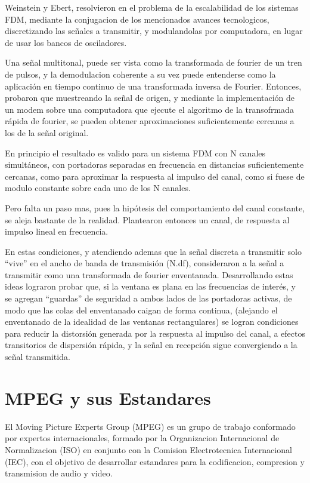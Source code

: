 Weinstein y Ebert, resolvieron en \cite{discrete-ofdm} el problema de la escalabilidad de los sistemas FDM, mediante la conjugacion de los mencionados avances tecnologicos, discretizando las señales a transmitir, y modulandolas por computadora, en lugar de usar los bancos de osciladores. 

Una señal multitonal, puede ser vista como la transformada de fourier de un tren de pulsos, y la demodulacion coherente a su vez puede entenderse como la aplicación en tiempo continuo de una transformada inversa de Fourier. Entonces, probaron que muestreando la señal de origen, y mediante la implementación de un modem sobre una computadora que ejecute el algoritmo de la transofrmada rápida de fourier, se pueden obtener aproximaciones suficientemente cercanas a los de la señal original. 

En principio el resultado es valido para un sistema FDM con N canales simultáneos, con portadoras separadas en frecuencia en distancias suficientemente cercanas, como para aproximar la respuesta al impulso del canal, como si fuese de modulo constante sobre cada uno de los N canales. 

Pero falta un paso mas, pues la hipótesis del comportamiento del canal constante, se aleja bastante de la realidad. Plantearon entonces un canal, de respuesta al impulso lineal en frecuencia.

En estas condiciones, y atendiendo ademas que la señal discreta a transmitir solo “vive” en el ancho de banda de transmisión (N.df), consideraron a la señal a transmitir como una transformada de fourier enventanada. Desarrollando estas ideas lograron probar que, si la ventana es plana en las frecuencias de interés, y se agregan “guardas” de seguridad a ambos lados de las portadoras activas, de modo que las colas del enventanado caigan de forma continua, (alejando el enventanado de la idealidad de las ventanas rectangulares) se logran condiciones para reducir la distorsión generada por la respuesta al impulso del canal, a efectos transitorios de dispersión rápida, y la señal en recepción sigue convergiendo a la señal transmitida.

\section{MPEG y sus Estandares}

El Moving Picture Experts Group (MPEG)\cite{MPEG} es un grupo de trabajo conformado por expertos internacionales, formado por la Organizacion Internacional de Normalizacion (ISO) en conjunto con la Comision Electrotecnica Internacional (IEC), con el objetivo de desarrollar estandares para la codificacion, compresion y transmision de audio y video.

